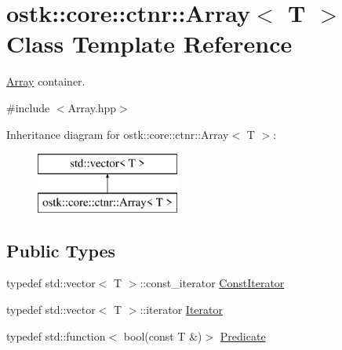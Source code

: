 \hypertarget{classostk_1_1core_1_1ctnr_1_1_array}{}\section{ostk\+:\+:core\+:\+:ctnr\+:\+:Array$<$ T $>$ Class Template Reference}
\label{classostk_1_1core_1_1ctnr_1_1_array}


\hyperlink{classostk_1_1core_1_1ctnr_1_1_array}{Array} container.  




{\ttfamily \#include $<$Array.\+hpp$>$}

Inheritance diagram for ostk\+:\+:core\+:\+:ctnr\+:\+:Array$<$ T $>$\+:\begin{figure}[H]
\begin{center}
\leavevmode
\includegraphics[height=2.000000cm]{classostk_1_1core_1_1ctnr_1_1_array}
\end{center}
\end{figure}
\subsection*{Public Types}
\begin{DoxyCompactItemize}
\item 
typedef std\+::vector$<$ T $>$\+::const\+\_\+iterator \hyperlink{classostk_1_1core_1_1ctnr_1_1_array_acf6e5ab86e3ad3e125f61b1933772a14}{Const\+Iterator}
\item 
typedef std\+::vector$<$ T $>$\+::iterator \hyperlink{classostk_1_1core_1_1ctnr_1_1_array_accf81dc56e553dad2ce7b72802836c46}{Iterator}
\item 
typedef std\+::function$<$ bool(const T \&)$>$ \hyperlink{classostk_1_1core_1_1ctnr_1_1_array_a7c04a98dd10cd625acf96addd312d0af}{Predicate}
\end{DoxyCompactItemize}
